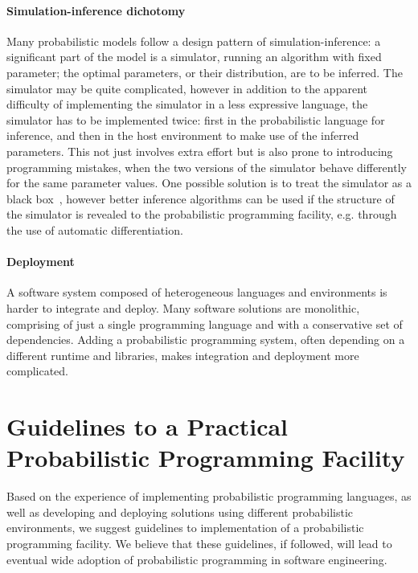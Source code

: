 \documentclass[sigplan,review]{acmart}\settopmatter{printfolios=true,printccs=false,printacmref=false}
\begin{document}
\paragraph{Simulation-inference dichotomy} Many probabilistic
models follow a design pattern of simulation-inference: a
significant part of the model is a simulator, running an
algorithm with fixed parameter; the optimal parameters, or their
distribution, are to be inferred. The simulator may be quite
complicated, however in addition to the apparent difficulty of
implementing the simulator in a less expressive language,  the
simulator has to be implemented twice: first in the
probabilistic language for inference, and then in the host
environment to make use of the inferred parameters. This not
just involves extra effort but is also prone to introducing
programming mistakes, when the two versions of the simulator
behave differently for the same parameter values. One possible
solution is to treat the simulator as a black box~\cite{LBW17},
however better inference algorithms can be used if the structure
of the simulator is revealed to the probabilistic programming
facility, e.g. through the use of automatic differentiation.

\paragraph{Deployment} A software system composed of
heterogeneous languages and environments is harder to integrate
and deploy. Many software solutions are monolithic, comprising
of just a single programming language and with a conservative
set of dependencies. Adding a probabilistic programming system,
often depending on a different runtime and libraries, makes
integration and deployment more complicated.

\section{Guidelines to a Practical Probabilistic Programming
Facility}

Based on the experience of implementing  probabilistic
programming languages, as well as developing and deploying
solutions using different probabilistic environments, we suggest
guidelines to implementation of a probabilistic programming
facility. We believe that these guidelines, if followed, will
lead to eventual wide adoption of probabilistic programming in
software engineering.
\end{document}
